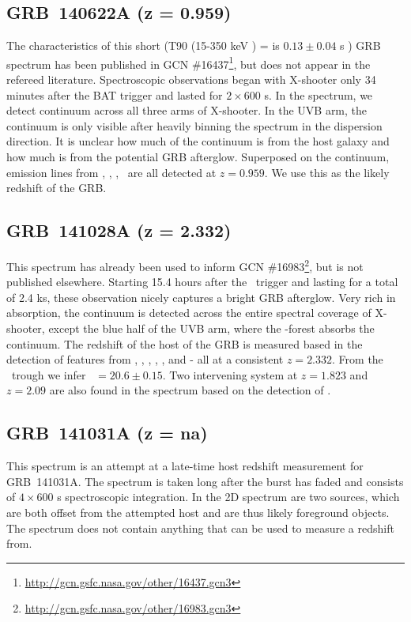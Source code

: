 \documentclass{aa}    %
\begin{document}
\subsection{GRB~140622A (z = 0.959)}	

The characteristics of this short (T90 (15-350 keV ) = is $0.13 \pm 0.04$ s
\citep{Lien2016}) GRB spectrum has been published in GCN
\#16437\footnote{\url{http://gcn.gsfc.nasa.gov/other/16437.gcn3}}, but does not
appear in the refereed literature. Spectroscopic observations began with
X-shooter only 34 minutes after the BAT trigger and lasted for $2\times600$ s.
In the spectrum, we detect continuum across all three arms of X-shooter. In the
UVB arm, the continuum is only visible after heavily binning the spectrum in the
dispersion direction. It is unclear how much of the continuum is from the host
galaxy and how much is from the potential GRB afterglow. Superposed on the
continuum, emission lines from \oii, \hb, \oiii, \ha~are all detected at $z =
0.959$. We use this as the likely redshift of the GRB.

\subsection{GRB~141028A (z = 2.332)}	

This spectrum has already been used to inform GCN
\#16983\footnote{\url{http://gcn.gsfc.nasa.gov/other/16983.gcn3}}, but is not
published elsewhere. Starting 15.4 hours after the \swift~trigger and lasting
for a total of 2.4 ks, these observation nicely captures a bright GRB afterglow.
Very rich in absorption, the continuum is detected across the entire spectral
coverage of X-shooter, except the blue half of the UVB arm, where the
\lya-forest absorbs the continuum. The redshift of the host of the GRB is
measured based in the detection of features from \lya, \SIii, \civ, \cii, \feii,
and \mgii - all at a consistent $z = 2.332$. From the \lya~trough we infer
\nh~$=20.6 \pm 0.15$. Two intervening system at $z = 1.823$ and $z = 2.09$ are
also found in the spectrum based on the detection of \civ.

\subsection{GRB~141031A  (z = na)}	

This spectrum is an attempt at a late-time host redshift measurement for
GRB~141031A. The spectrum is taken long after the burst has faded and consists
of $4\times600$ s spectroscopic integration. In the 2D spectrum are two sources,
which are both offset from the attempted host and are thus likely foreground
objects. The spectrum does not contain anything that can be used to measure a
redshift from.
\end{document}
